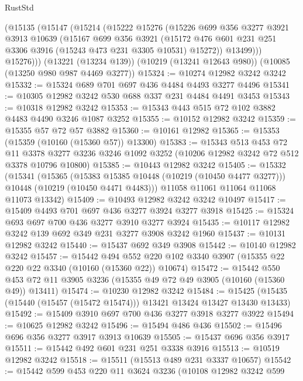 \begin{lexlean}{RustStd}
\begin{coremodule}
      (@15135
        (@15147
          (@15214
            (@15222
              @15276
              (@15226
                @699
                @356
                @3277
                @3921
                @3913
                @10639
                (@15167
                  @699
                  @356
                  @3921
                  (@15172 @476 @601 @231 @251 @3306 @3916 (@15243 @473 @231 @3305 @10531) @15272))
                @13499)))
          @15276)))
    (@13221 (@13234 @139))
    (@10219 (@13241 @12643 @980))
    (@10085 (@13250 @980 @987 @4469 @3277))
@15324 := @10274 @12982 @3242 @3242
@15332 := @15324 @689 @701 @697 @436 @4484 @4493 @3277 @4496
@15341 := @10305 @12982 @3242 @530 @688 @337 @231 @4484 @4491 @3453
@15343 := @10318 @12982 @3242
@15353 := @15343 @443 @515 @72 @102 @3882 @4483 @4490 @3246 @1087 @3252
@15355 := @10152 @12982 @3242
@15359 := @15355 @57 @72 @57 @3882
@15360 := @10161 @12982
@15365 := @15353 (@15359 (@10160 (@15360 @57)) @13300)
@15383 := @15343
    @513
    @453
    @72
    @11
    @3378
    @3277
    @3236
    @3246
    @1092
    @3252
    (@10206 @12982 @3242 @72 @512 @3378 @10796 @10800)
@15385 := @10443 @12982 @3242
@15405 := @15332
    (@15341
      (@15365
        (@15383 @15385 @10448 (@10219 (@10450 @4477 @3277)))
        @10448
        (@10219 (@10450 @4471 @4483)))
      @11058
      @11061
      @11064
      @11068
      @11073
      @13342)
@15409 := @10493 @12982 @3242 @3242 @10497
@15417 := @15409 @4493 @701 @697 @436 @3277 @3924 @3277 @3918
@15425 := @15324 @693 @697 @700 @436 @3277 @3910 @3277 @3924
@15435 := @10117 @12982 @3242 @139 @692 @349 @231 @3277 @3908 @3242 @1960
@15437 := @10131 @12982 @3242
@15440 := @15437 @692 @349 @3908
@15442 := @10140 @12982 @3242
@15457 := @15442
    @494
    @552
    @220
    @102
    @3340
    @3907
    (@15355 @22 @220 @22 @3340 (@10160 (@15360 @22)) @10674)
@15472 := @15442
    @550
    @453
    @72
    @11
    @3905
    @3236
    (@15355 @49 @72 @49 @3905 (@10160 (@15360 @49)) @13411)
@15474 := @10230 @12982 @3242
@15484 := @15425 (@15435 (@15440 (@15457 (@15472 @15474))) @13421 @13424 @13427 @13430 @13433)
@15492 := @15409 @3910 @697 @700 @436 @3277 @3918 @3277 @3922
@15494 := @10625 @12982 @3242
@15496 := @15494 @486 @436
@15502 := @15496 @696 @356 @3277 @3917 @3913 @10639
@15505 := @15437 @696 @356 @3917
@15511 := @15442 @492 @601 @231 @251 @3338 @3916
@15513 := @10519 @12982 @3242
@15518 := @15511 (@15513 @489 @231 @3337 @10657)
@15542 := @15442
    @599
    @453
    @220
    @11
    @3624
    @3236
    (@10108
      @12982
      @3242
      @599

\end{coremodule}
\end{lexlean}
